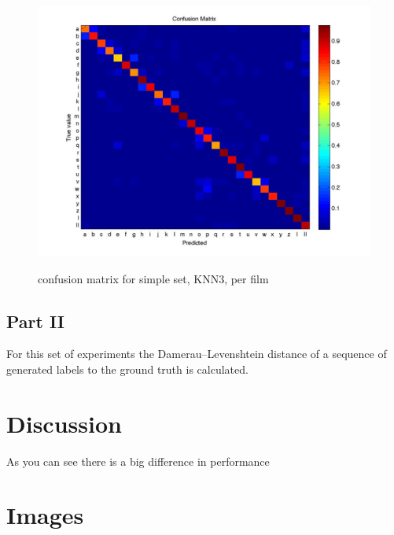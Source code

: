 \begin{figure}[htbp]
\begin{center}
\label{fig:confusion}
\includegraphics[width=\linewidth]{confmat/confusion.jpg}
\end{center}
\caption{confusion matrix for simple set, KNN3, per film}
\end{figure}






\subsection{Part II}

For this set of experiments the Damerau–Levenshtein distance of a sequence of generated labels to the ground truth is calculated.


\section{Discussion}
As you can see there is a big difference in performance



\section{Images}

